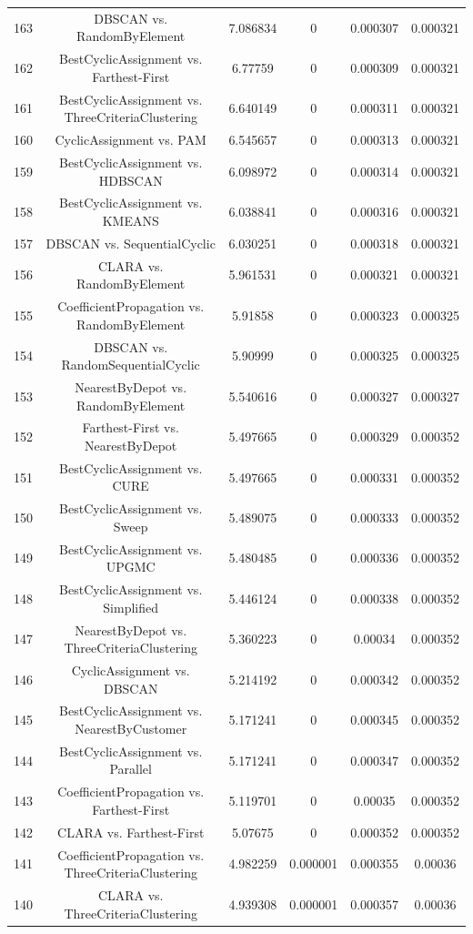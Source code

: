 \documentclass[a4paper,10pt]{article}
\begin{document}
\begin{landscape}
\begin{table}[!htp]
\begin{tabular}{cccccc}
163&DBSCAN vs. RandomByElement&7.086834&0&0.000307&0.000321\\
162&BestCyclicAssignment vs. Farthest-First&6.77759&0&0.000309&0.000321\\
161&BestCyclicAssignment vs. ThreeCriteriaClustering&6.640149&0&0.000311&0.000321\\
160&CyclicAssignment vs. PAM&6.545657&0&0.000313&0.000321\\
159&BestCyclicAssignment vs. HDBSCAN&6.098972&0&0.000314&0.000321\\
158&BestCyclicAssignment vs. KMEANS&6.038841&0&0.000316&0.000321\\
157&DBSCAN vs. SequentialCyclic&6.030251&0&0.000318&0.000321\\
156&CLARA vs. RandomByElement&5.961531&0&0.000321&0.000321\\
155&CoefficientPropagation vs. RandomByElement&5.91858&0&0.000323&0.000325\\
154&DBSCAN vs. RandomSequentialCyclic&5.90999&0&0.000325&0.000325\\
153&NearestByDepot vs. RandomByElement&5.540616&0&0.000327&0.000327\\
152&Farthest-First vs. NearestByDepot&5.497665&0&0.000329&0.000352\\
151&BestCyclicAssignment vs. CURE&5.497665&0&0.000331&0.000352\\
150&BestCyclicAssignment vs. Sweep&5.489075&0&0.000333&0.000352\\
149&BestCyclicAssignment vs. UPGMC&5.480485&0&0.000336&0.000352\\
148&BestCyclicAssignment vs. Simplified&5.446124&0&0.000338&0.000352\\
147&NearestByDepot vs. ThreeCriteriaClustering&5.360223&0&0.00034&0.000352\\
146&CyclicAssignment vs. DBSCAN&5.214192&0&0.000342&0.000352\\
145&BestCyclicAssignment vs. NearestByCustomer&5.171241&0&0.000345&0.000352\\
144&BestCyclicAssignment vs. Parallel&5.171241&0&0.000347&0.000352\\
143&CoefficientPropagation vs. Farthest-First&5.119701&0&0.00035&0.000352\\
142&CLARA vs. Farthest-First&5.07675&0&0.000352&0.000352\\
141&CoefficientPropagation vs. ThreeCriteriaClustering&4.982259&0.000001&0.000355&0.00036\\
140&CLARA vs. ThreeCriteriaClustering&4.939308&0.000001&0.000357&0.00036\\

\end{tabular}
\end{table}
\end{landscape}
\end{document}
